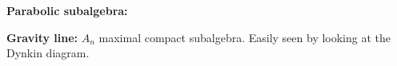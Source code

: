 \textbf{Parabolic subalgebra:}

\textbf{Gravity line:}
$A_n$ maximal compact subalgebra. Easily seen by looking at the Dynkin diagram.